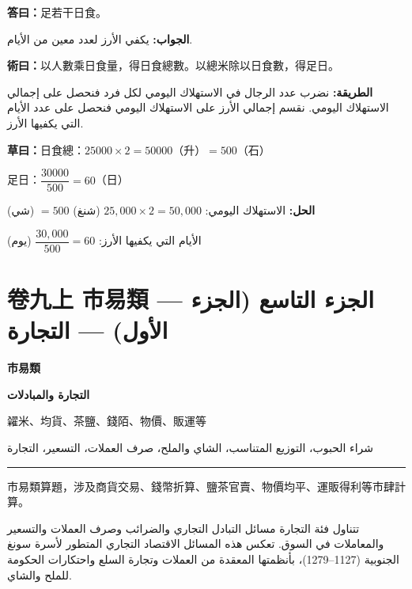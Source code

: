 \documentclass[11pt,a4paper]{article}
\newcommand{\ar}[1]{\arabicfont\beginR #1\endR}
\newcommand{\longline}{\noindent\rule{\textwidth}{0.4pt}}
\newcounter{probnum}
\newcommand{\answer}[2]{\par\noindent%
  \begin{minipage}[t]{0.48\textwidth}\textbf{答曰：}#1\end{minipage}%
  \hfill%
  \begin{minipage}[t]{0.48\textwidth}\arabicfont\beginR\textbf{الجواب:} #2\endR\end{minipage}\par\vspace{0.2cm}}
\newcommand{\method}[2]{\par\noindent%
  \begin{minipage}[t]{0.48\textwidth}\textbf{術曰：}#1\end{minipage}%
  \hfill%
  \begin{minipage}[t]{0.48\textwidth}\arabicfont\beginR\textbf{الطريقة:} #2\endR\end{minipage}\par\vspace{0.3cm}}
\newcommand{\working}[2]{\par\noindent%
  \begin{minipage}[t]{0.48\textwidth}\textbf{草曰：}#1\end{minipage}%
  \hfill%
  \begin{minipage}[t]{0.48\textwidth}\arabicfont\beginR\textbf{الحل:} #2\endR\end{minipage}\par\vspace{0.2cm}}
\begin{document}
\answer{足若干日食。}{يكفي الأرز لعدد معين من الأيام.}

\method{以人數乘日食量，得日食總數。以總米除以日食數，得足日。}{نضرب عدد الرجال في الاستهلاك اليومي لكل فرد فنحصل على إجمالي الاستهلاك اليومي. نقسم إجمالي الأرز على الاستهلاك اليومي فنحصل على عدد الأيام التي يكفيها الأرز.}

\working{日食總：$25000 \times 2 = 50000$（升）$= 500$（石）

足日：$\dfrac{30000}{500} = 60$（日）}{الاستهلاك اليومي: $25{,}000 \times 2 = 50{,}000$ (شنغ) $= 500$ (شي)

الأيام التي يكفيها الأرز: $\dfrac{30{,}000}{500} = 60$ (يوم)}

\newpage

\setcounter{probnum}{0}

\section{卷九上 \quad 市易類 — \ar{الجزء التاسع (الجزء الأول) — التجارة}}
\label{sec:fasc9a}

\begin{center}
{\Large\bfseries\color{volcolor} 市易類}

\vspace{0.2cm}

{\fontsize{14}{18}\selectfont\arabicfont\beginR\color{volcolor}\textbf{التجارة والمبادلات}\endR}

\vspace{0.2cm}

{\small\color{notecolor} 糴米、均貨、茶鹽、錢陌、物價、販運等}

{\small\color{notecolor}\arabicfont\beginR شراء الحبوب، التوزيع المتناسب، الشاي والملح، صرف العملات، التسعير، التجارة\endR}
\end{center}

\vspace{0.3cm}
\longline
\vspace{0.3cm}

\noindent
\begin{minipage}[t]{0.48\textwidth}
市易類算題，涉及商貨交易、錢幣折算、鹽茶官賣、物價均平、運販得利等市肆計算。
\end{minipage}
\hfill
\begin{minipage}[t]{0.48\textwidth}
\arabicfont\beginR
تتناول فئة التجارة مسائل التبادل التجاري والضرائب وصرف العملات
والتسعير والمعاملات في السوق. تعكس هذه المسائل الاقتصاد التجاري
المتطور لأسرة سونغ الجنوبية (1127--1279)، بأنظمتها المعقدة من
العملات وتجارة السلع واحتكارات الحكومة للملح والشاي.
\endR
\end{minipage}
\end{document}
